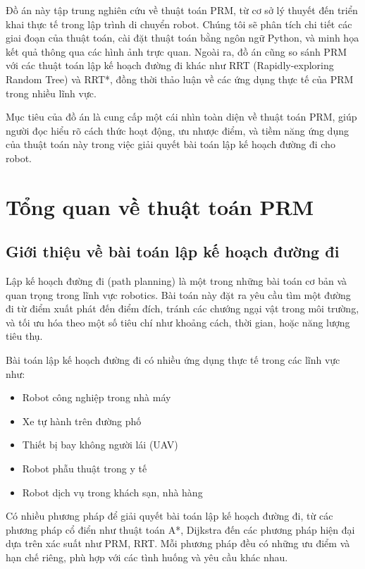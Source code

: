 \documentclass[12pt,a4paper,openany,oneside]{report}
\begin{document}
Đồ án này tập trung nghiên cứu về thuật toán PRM, từ cơ sở lý thuyết đến triển khai thực tế trong lập trình di chuyển robot. Chúng tôi sẽ phân tích chi tiết các giai đoạn của thuật toán, cài đặt thuật toán bằng ngôn ngữ Python, và minh họa kết quả thông qua các hình ảnh trực quan. Ngoài ra, đồ án cũng so sánh PRM với các thuật toán lập kế hoạch đường đi khác như RRT (Rapidly-exploring Random Tree) và RRT*, đồng thời thảo luận về các ứng dụng thực tế của PRM trong nhiều lĩnh vực.

Mục tiêu của đồ án là cung cấp một cái nhìn toàn diện về thuật toán PRM, giúp người đọc hiểu rõ cách thức hoạt động, ưu nhược điểm, và tiềm năng ứng dụng của thuật toán này trong việc giải quyết bài toán lập kế hoạch đường đi cho robot.

\chapter{Tổng quan về thuật toán PRM}

\section{Giới thiệu về bài toán lập kế hoạch đường đi}

Lập kế hoạch đường đi (path planning) là một trong những bài toán cơ bản và quan trọng trong lĩnh vực robotics. Bài toán này đặt ra yêu cầu tìm một đường đi từ điểm xuất phát đến điểm đích, tránh các chướng ngại vật trong môi trường, và tối ưu hóa theo một số tiêu chí như khoảng cách, thời gian, hoặc năng lượng tiêu thụ.

Bài toán lập kế hoạch đường đi có nhiều ứng dụng thực tế trong các lĩnh vực như:
\begin{itemize}
    \item Robot công nghiệp trong nhà máy
    \item Xe tự hành trên đường phố
    \item Thiết bị bay không người lái (UAV)
    \item Robot phẫu thuật trong y tế
    \item Robot dịch vụ trong khách sạn, nhà hàng
\end{itemize}

Có nhiều phương pháp để giải quyết bài toán lập kế hoạch đường đi, từ các phương pháp cổ điển như thuật toán A*, Dijkstra đến các phương pháp hiện đại dựa trên xác suất như PRM, RRT. Mỗi phương pháp đều có những ưu điểm và hạn chế riêng, phù hợp với các tình huống và yêu cầu khác nhau.
\end{document}
